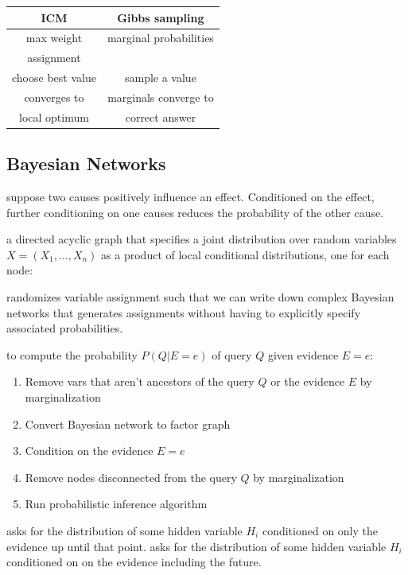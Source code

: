 \begin{tabular}{|c|c|}
    \hline
    \textbf{ICM} & \textbf{Gibbs sampling} \\
    \hline
    max weight & marginal probabilities \\ 
    assignment &   \\ 
    \hline
    choose best value & sample a value \\
    \hline
    converges to & marginals converge to\\
    local optimum & correct answer \\
    \hline
\end{tabular}

\subsection{Bayesian Networks}


 suppose two causes positively influence an effect.
Conditioned on the effect, further conditioning on one causes reduces the
probability of the other cause.

 a directed acyclic graph that specifies a joint distribution
over random variables $X=(X_1,\dots,X_n)$ as a product of local conditional distributions,
one for each node: 

 randomizes variable assignment such that we can
write down complex Bayesian networks that generates assignments without having
to explicitly specify associated probabilities.

 to compute the probability $P(Q|E=e)$
of query $Q$ given evidence $E=e$:
\begin{enumerate}
    \item Remove vars that aren't ancestors of the query $Q$ or the evidence $E$ by marginalization
    \item Convert Bayesian network to factor graph
    \item Condition on the evidence $E=e$
    \item Remove nodes disconnected from the query $Q$ by marginalization
    \item Run probabilistic inference algorithm
\end{enumerate}
 asks for the distribution of some hidden variable
$H_i$ conditioned on only the evidence up until that point. 
 asks for the distribution of some hidden variable
$H_i$ conditioned on on the evidence including the future. 

